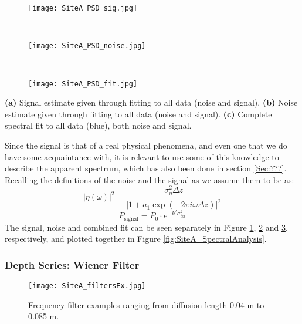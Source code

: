 \documentclass[../../CompleteThesis/Complete_1stDraft.tex]{subfiles}
\begin{document}
\begin{marginfigure}
	\centering
	\begin{subfigure}{\marginparwidth}
		\centering
		\texttt{[image: SiteA\_PSD\_sig.jpg]}
		\caption{\footnotesize}
		\label{fig:SiteA_PSD_sig}
	\end{subfigure}\\[1ex]
	
	\begin{subfigure}{\marginparwidth}
		\centering
		\texttt{[image: SiteA\_PSD\_noise.jpg]}
		\caption{\footnotesize}
		\label{fig:SiteA_PSD_noise}
	\end{subfigure}\\[1ex]
	
	\begin{subfigure}{\marginparwidth}
		\centering
		\texttt{[image: SiteA\_PSD\_fit.jpg]}
		\caption{\footnotesize}
		\label{fig:SiteA_PSD_fit}
	\end{subfigure}
	\caption[Isolated spectral fits, Site A]{\footnotesize\textbf{(a)} Signal estimate given through fitting to all data (noise and signal). \textbf{(b)} Noise estimate given through fitting to all data (noise and signal). \textbf{(c)} Complete spectral fit to all data (blue), both noise and signal.}
	\label{fig:SpectralFitsIsolated}
\end{marginfigure}
Since the signal is that of a real physical phenomena, and even one that we do have some acquaintance with, it is relevant to use some of this knowledge to describe the apparent spectrum, which has also been done in section \ref{Sec:???}. Recalling the definitions of the noise and the signal as we assume them to be as:
\begin{equation}
	|\eta(\omega)|^2 = \frac{\sigma_{\eta}^2\Delta z}{|1+a_1\exp(-2\pi i \omega\Delta z)|^2}
	\label{Eq:MethodNoiseFit}
\end{equation}
\begin{equation}
	P_{\text{signal}} = P_0 \cdot e^{-k^2\sigma_{tot}^2}
	\label{Eq:MethodSignalFit}
\end{equation}
The signal, noise and combined fit can be seen separately in Figure \ref{fig:SiteA_PSD_sig}, \ref{fig:SiteA_PSD_noise} and \ref{fig:SiteA_PSD_fit}, respectively, and plotted together in Figure \ref{fig:SiteA_SpectralAnalysis}.


\subsubsection[Wiener Filter]{Depth Series: Wiener Filter}
\begin{figure}[h]
	\centering
	\texttt{[image: SiteA\_filtersEx.jpg]}
	\caption[Frequency filters example, Site A]{Frequency filter examples ranging from diffusion length 0.04 m to 0.085 m.}
	\label{fig:SiteA_filtersEx}
\end{figure}
\end{document}
